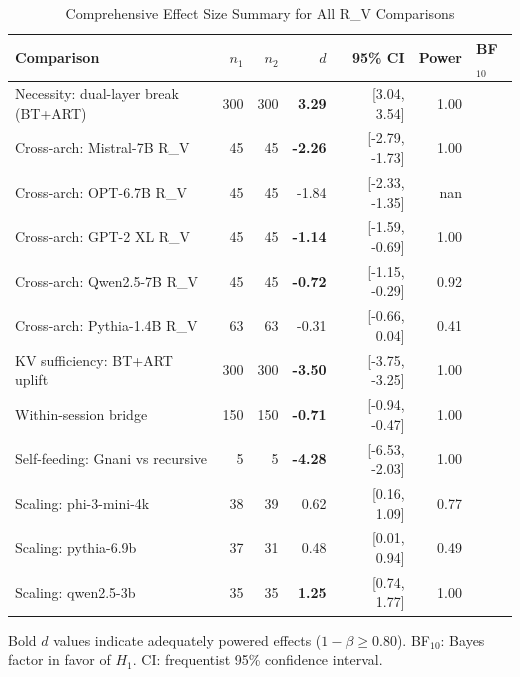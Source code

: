 \begin{table}[t]
\centering
\caption{Comprehensive Effect Size Summary for All R\_V Comparisons}
\label{tab:effect_sizes}
\small
\begin{tabular}{lrrrrrl}
\toprule
Comparison & $n_1$ & $n_2$ & $d$ & 95\% CI & Power & BF$_{10}$ \\
\midrule
Necessity: dual-layer break (BT+ART) & 300 & 300 & \textbf{3.29} & [3.04, 3.54] & 1.00 &  \\
Cross-arch: Mistral-7B R\_V & 45 & 45 & \textbf{-2.26} & [-2.79, -1.73] & 1.00 &  \\
Cross-arch: OPT-6.7B R\_V & 45 & 45 & -1.84 & [-2.33, -1.35] & nan &  \\
Cross-arch: GPT-2 XL R\_V & 45 & 45 & \textbf{-1.14} & [-1.59, -0.69] & 1.00 &  \\
Cross-arch: Qwen2.5-7B R\_V & 45 & 45 & \textbf{-0.72} & [-1.15, -0.29] & 0.92 &  \\
Cross-arch: Pythia-1.4B R\_V & 63 & 63 & -0.31 & [-0.66, 0.04] & 0.41 &  \\
KV sufficiency: BT+ART uplift & 300 & 300 & \textbf{-3.50} & [-3.75, -3.25] & 1.00 &  \\
Within-session bridge & 150 & 150 & \textbf{-0.71} & [-0.94, -0.47] & 1.00 &  \\
Self-feeding: Gnani vs recursive & 5 & 5 & \textbf{-4.28} & [-6.53, -2.03] & 1.00 &  \\
\addlinespace
Scaling: phi-3-mini-4k & 38 & 39 & 0.62 & [0.16, 1.09] & 0.77 &  \\
Scaling: pythia-6.9b & 37 & 31 & 0.48 & [0.01, 0.94] & 0.49 &  \\
Scaling: qwen2.5-3b & 35 & 35 & \textbf{1.25} & [0.74, 1.77] & 1.00 &  \\
\bottomrule
\end{tabular}
\vspace{1mm}
\raggedright\footnotesize
Bold $d$ values indicate adequately powered effects ($1-\beta \geq 0.80$).
BF$_{10}$: Bayes factor in favor of $H_1$. CI: frequentist 95\% confidence interval.
\end{table}